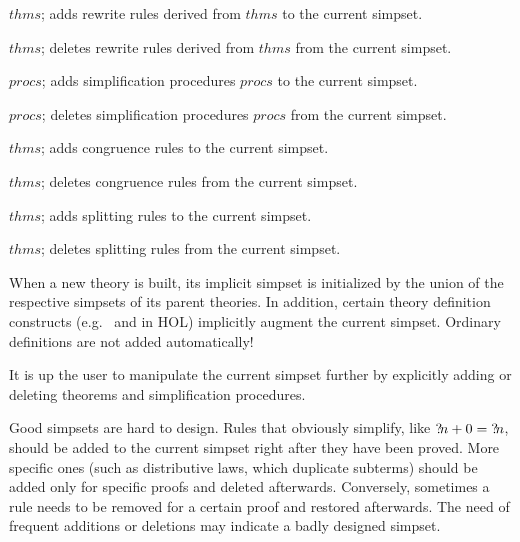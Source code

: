 \begin{ttdescription}

\item[\ttindexbold{Addsimps} $thms$;] adds rewrite rules derived from
  $thms$ to the current simpset.
  
\item[\ttindexbold{Delsimps} $thms$;] deletes rewrite rules derived
  from $thms$ from the current simpset.
  
\item[\ttindexbold{Addsimprocs} $procs$;] adds simplification
  procedures $procs$ to the current simpset.
  
\item[\ttindexbold{Delsimprocs} $procs$;] deletes simplification
  procedures $procs$ from the current simpset.
  
\item[\ttindexbold{Addcongs} $thms$;] adds congruence rules to the
  current simpset.
  
\item[\ttindexbold{Delcongs} $thms$;] deletes congruence rules from the
  current simpset.

\item[\ttindexbold{Addsplits} $thms$;] adds splitting rules to the
  current simpset.
  
\item[\ttindexbold{Delsplits} $thms$;] deletes splitting rules from the
  current simpset.

\end{ttdescription}

When a new theory is built, its implicit simpset is initialized by the union
of the respective simpsets of its parent theories.  In addition, certain
theory definition constructs (e.g.\  and 
in HOL) implicitly augment the current simpset.  Ordinary definitions are not
added automatically!

It is up the user to manipulate the current simpset further by
explicitly adding or deleting theorems and simplification procedures.

\medskip

Good simpsets are hard to design.  Rules that obviously simplify,
like ${?\!n}+0 = {?\!n}$, should be added to the current simpset right after
they have been proved.  More specific ones (such as distributive laws, which
duplicate subterms) should be added only for specific proofs and deleted
afterwards.  Conversely, sometimes a rule needs
to be removed for a certain proof and restored afterwards.  The need of
frequent additions or deletions may indicate a badly designed
simpset.

